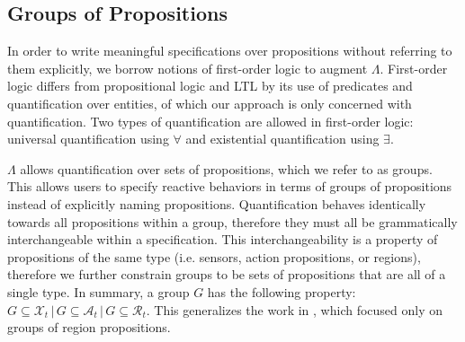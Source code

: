 \subsection{Groups of Propositions} 

In order to write meaningful specifications over propositions without referring to them explicitly, we borrow notions of first-order logic to augment $\Lambda$. 
First-order logic differs from propositional logic and LTL by its use of predicates and quantification over entities, of which our approach is only concerned with quantification. 
Two types of quantification are allowed in first-order logic: universal quantification using $\forall$ and existential quantification using $\exists$. 
\par $\Lambda$ allows quantification over sets of propositions, which we refer to as groups. 
This allows users to specify reactive behaviors in terms of groups of propositions instead of explicitly naming propositions. 
Quantification behaves identically towards all propositions within a group, therefore they must all be grammatically interchangeable within a specification. 
This interchangeability is a property of propositions of the same type (i.e. sensors, action propositions, or regions), therefore we further constrain groups to be sets of propositions that are all of a single type. 
In summary, a group $G$ has the following property:
$G \subseteq \mathcal{X}_t\,|\,G \subseteq \mathcal{A}_t\,|\,G \subseteq \mathcal{R}_t$.
This generalizes the work in \cite{BingxinRSS2012}, which focused only on groups of region propositions. 

